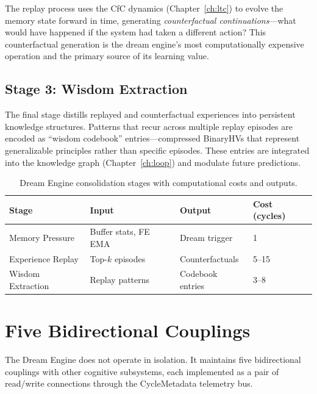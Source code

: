 \documentclass[12pt]{book}
\begin{document}
The replay process uses the CfC dynamics (Chapter~\ref{ch:ltc}) to evolve the memory state forward in time, generating \textit{counterfactual continuations}---what would have happened if the system had taken a different action? This counterfactual generation is the dream engine's most computationally expensive operation and the primary source of its learning value.

\subsection{Stage 3: Wisdom Extraction}

The final stage distills replayed and counterfactual experiences into persistent knowledge structures. Patterns that recur across multiple replay episodes are encoded as ``wisdom codebook'' entries---compressed BinaryHVs that represent generalizable principles rather than specific episodes. These entries are integrated into the knowledge graph (Chapter~\ref{ch:loop}) and modulate future predictions.

\begin{table}[htbp]
\centering
\caption{Dream Engine consolidation stages with computational costs and outputs.}
\label{tab:dream-stages}
\begin{tabular}{@{}llll@{}}
\toprule
\textbf{Stage} & \textbf{Input} & \textbf{Output} & \textbf{Cost (cycles)} \\
\midrule
Memory Pressure  & Buffer stats, FE EMA & Dream trigger     & 1 \\
Experience Replay & Top-$k$ episodes    & Counterfactuals   & 5--15 \\
Wisdom Extraction & Replay patterns     & Codebook entries  & 3--8 \\
\bottomrule
\end{tabular}
\end{table}

\section{Five Bidirectional Couplings}

The Dream Engine does not operate in isolation. It maintains five bidirectional couplings with other cognitive subsystems, each implemented as a pair of read/write connections through the CycleMetadata telemetry bus.
\end{document}
